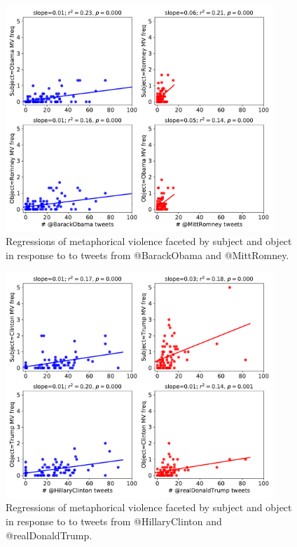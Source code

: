 \begin{figure}[h]
  \centering
    \includegraphics[width=0.9\textwidth]{Figures/2012-subjobj.pdf}
  \caption{Regressions of metaphorical violence faceted by subject and object
    in response to to tweets from @BarackObama and @MittRomney.}
  \label{fig:2012-subjobj}
\end{figure}


\begin{figure}[h]
  \centering
    \includegraphics[width=0.9\textwidth]{Figures/2016-subjobj.pdf}
  \caption{Regressions of metaphorical violence faceted by subject and object
    in response to to tweets from @HillaryClinton and @realDonaldTrump.}
  \label{fig:2016-subjobj}
\end{figure}



